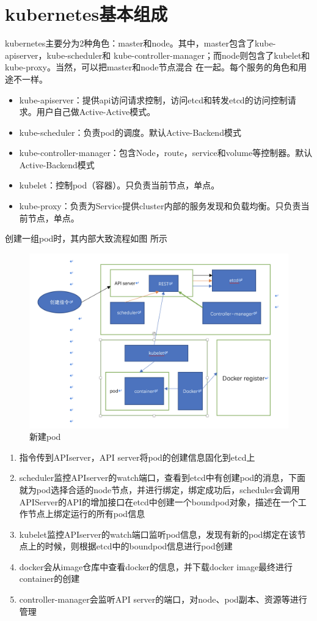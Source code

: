 \section{kubernetes基本组成}
kubernetes主要分为2种角色：master和node。其中，master包含了kube-apiserver，kube-scheduler和
kube-controller-manager；而node则包含了kubelet和kube-proxy。当然，可以把master和node节点混合
在一起。每个服务的角色和用途不一样。
\begin{itemize}
    \item kube-apiserver：提供api访问请求控制，访问etcd和转发etcd的访问控制请求。用户自己做Active-Active模式。
    \item kube-scheduler：负责pod的调度。默认Active-Backend模式
    \item kube-controller-manager：包含Node，route，service和volume等控制器。默认Active-Backend模式
    \item kubelet：控制pod（容器）。只负责当前节点，单点。
    \item kube-proxy：负责为Service提供cluster内部的服务发现和负载均衡。只负责当前节点，单点。
\end{itemize}

创建一组pod时，其内部大致流程如图 所示
\begin{figure}[H]
  \centering
  \includegraphics[scale=0.5]{create_pod.png}
  \caption{新建pod}
  \label{fig:create_pod}
\end{figure}

\begin{enumerate}
    \item 指令传到APIserver，API server将pod的创建信息固化到etcd上
    \item scheduler监控APIserver的watch端口，查看到etcd中有创建pod的消息，下面就为pod选择合适的node节点，并进行绑定，绑定成功后，scheduler会调用APIServer的API的增加接口在etcd中创建一个boundpod对象，描述在一个工作节点上绑定运行的所有pod信息
    \item kubelet监控APIserver的watch端口监听pod信息，发现有新的pod绑定在该节点上的时候，则根据etcd中的boundpod信息进行pod创建
    \item docker会从image仓库中查看docker的信息，并下载docker image最终进行container的创建
    \item controller-manager会监听API server的端口，对node、pod副本、资源等进行管理
\end{enumerate}

